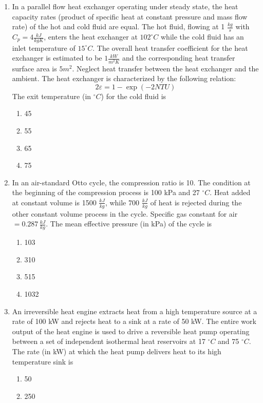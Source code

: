 \documentclass[journal]{IEEEtran}
\begin{document}
\begin{enumerate}
\begin{enumerate}
  \end{enumerate}
  \item In a parallel flow heat exchanger operating under steady state, the heat capacity rates (product of specific heat at constant pressure and mass flow rate) of the hot and cold fluid are equal. The hot fluid, flowing at 1 $\frac{kg}{s}$ with $C_p = 4  \frac{kJ}{kgK}$, enters the heat exchanger at $102^\circ C$ while the cold fluid has an inlet temperature of $15^\circ C$. The overall heat transfer coefficient for the heat exchanger is estimated to be $1 \frac{kW}{m^2K}$ and the corresponding heat transfer surface area is $5 m^2$. Neglect heat transfer between the heat exchanger and the ambient. The heat exchanger is characterized by the following relation:
 $$ 2\varepsilon = 1 - \exp(-2 NTU) $$
 The exit temperature (in $^\circ C$) for the cold fluid is
  \begin{enumerate}
    \item  45
    \item  55
    \item  65
    \item  75
  \end{enumerate}
\item In an air-standard Otto cycle, the compression ratio is 10. The condition at the beginning of the compression process is 100 kPa and 27 $^\circ C$. Heat added at constant volume is 1500 $\frac{kJ}{kg}$, while 700 $\frac{kJ}{kg}$ of heat is rejected during the other constant volume process in the cycle. Specific gas constant for air $= 0.287 \, \frac{kJ}{kg}$. The mean effective pressure (in kPa) of the cycle is
\begin{enumerate}
    \item  103
    \item  310
    \item  515
    \item  1032
  \end{enumerate}
  \item An irreversible heat engine extracts heat from a high temperature source at a rate of 100 kW and rejects heat to a sink at a rate of 50 kW. The entire work output of the heat engine is used to drive a reversible heat pump operating between a set of independent isothermal heat reservoirs at 17 $^\circ C$ and 75 $^\circ C$. The rate (in kW) at which the heat pump delivers heat to its high temperature sink is
  \begin{enumerate}
    \item  50
    \item  250

\end{enumerate}
\end{enumerate}
\end{document}

